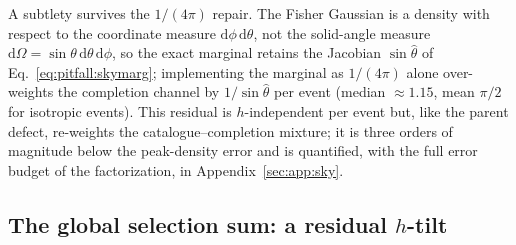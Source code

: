 A subtlety survives the $1/(4\pi)$ repair. The Fisher Gaussian is a density with respect to the coordinate measure $\mathrm{d}\phi\,\mathrm{d}\theta$, not the solid-angle measure $\mathrm{d}\Omega = \sin\theta\,\mathrm{d}\theta\,\mathrm{d}\phi$, so the exact marginal retains the Jacobian $\sin\hat{\theta}$ of Eq.~\eqref{eq:pitfall:skymarg}; implementing the marginal as $1/(4\pi)$ alone over-weights the completion channel by $1/\sin\hat{\theta}$ per event (median $\approx 1.15$, mean $\pi/2$ for isotropic events). %
This residual is $h$-independent per event but, like the parent defect, re-weights the catalogue--completion mixture; it is three orders of magnitude below the peak-density error and is quantified, with the full error budget of the factorization, in Appendix~\ref{sec:app:sky}.

\subsection{The global selection sum: a residual $h$-tilt}
\label{sec:pitfall:global}

